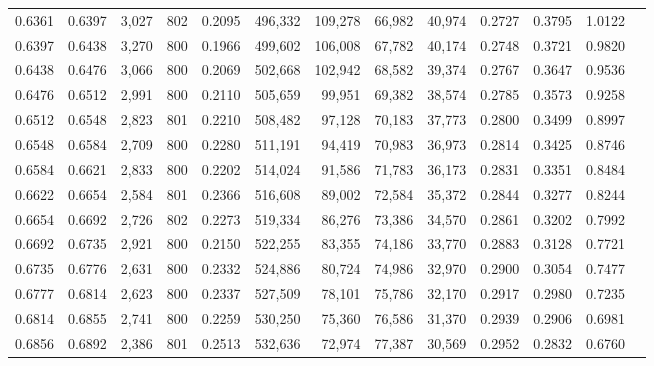 \begin{tabular}{rrrrrrrrrrrrr}
0.6361 & 0.6397 &  3,027 & 802 &                                     0.2095 & 496,332 & 109,278 &  66,982 &  40,974 & 0.2727 & 0.3795 & 1.0122 \\
0.6397 & 0.6438 &  3,270 & 800 &                                     0.1966 & 499,602 & 106,008 &  67,782 &  40,174 & 0.2748 & 0.3721 & 0.9820 \\
0.6438 & 0.6476 &  3,066 & 800 &                                     0.2069 & 502,668 & 102,942 &  68,582 &  39,374 & 0.2767 & 0.3647 & 0.9536 \\
0.6476 & 0.6512 &  2,991 & 800 &                                     0.2110 & 505,659 &  99,951 &  69,382 &  38,574 & 0.2785 & 0.3573 & 0.9258 \\
0.6512 & 0.6548 &  2,823 & 801 &                                     0.2210 & 508,482 &  97,128 &  70,183 &  37,773 & 0.2800 & 0.3499 & 0.8997 \\
0.6548 & 0.6584 &  2,709 & 800 &                                     0.2280 & 511,191 &  94,419 &  70,983 &  36,973 & 0.2814 & 0.3425 & 0.8746 \\
0.6584 & 0.6621 &  2,833 & 800 &                                     0.2202 & 514,024 &  91,586 &  71,783 &  36,173 & 0.2831 & 0.3351 & 0.8484 \\
0.6622 & 0.6654 &  2,584 & 801 &                                     0.2366 & 516,608 &  89,002 &  72,584 &  35,372 & 0.2844 & 0.3277 & 0.8244 \\
0.6654 & 0.6692 &  2,726 & 802 &                                     0.2273 & 519,334 &  86,276 &  73,386 &  34,570 & 0.2861 & 0.3202 & 0.7992 \\
0.6692 & 0.6735 &  2,921 & 800 &                                     0.2150 & 522,255 &  83,355 &  74,186 &  33,770 & 0.2883 & 0.3128 & 0.7721 \\
0.6735 & 0.6776 &  2,631 & 800 &                                     0.2332 & 524,886 &  80,724 &  74,986 &  32,970 & 0.2900 & 0.3054 & 0.7477 \\
0.6777 & 0.6814 &  2,623 & 800 &                                     0.2337 & 527,509 &  78,101 &  75,786 &  32,170 & 0.2917 & 0.2980 & 0.7235 \\
0.6814 & 0.6855 &  2,741 & 800 &                                     0.2259 & 530,250 &  75,360 &  76,586 &  31,370 & 0.2939 & 0.2906 & 0.6981 \\
0.6856 & 0.6892 &  2,386 & 801 &                                     0.2513 & 532,636 &  72,974 &  77,387 &  30,569 & 0.2952 & 0.2832 & 0.6760 \\

\end{tabular}
